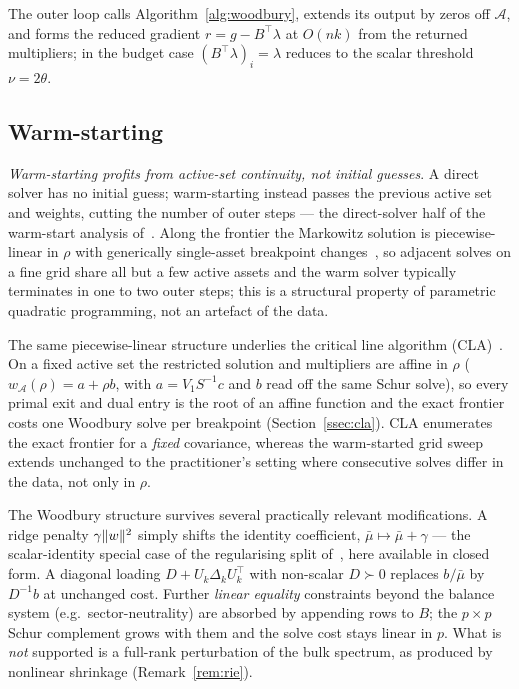 The outer loop calls Algorithm~\ref{alg:woodbury}, extends its output by zeros
off $\mathcal{A}$, and forms the reduced gradient $r = g - B^\top\lambda$ at
$O(nk)$ from the returned multipliers; in the budget case
$(B^\top\lambda)_i = \lambda$ reduces to the scalar threshold $\nu = 2\theta$.

\subsection{Warm-starting}

\emph{Warm-starting profits from active-set continuity, not initial guesses}.
A direct solver has no initial guess; warm-starting instead passes the previous
active set and weights, cutting the number of outer steps --- the direct-solver
half of the warm-start analysis
of~\cite[Proposition~4.2]{schmelzer2026nncg}. Along the frontier the
Markowitz solution is piecewise-linear in $\rho$ with generically single-asset
breakpoint changes~\cite{markowitz1956}, so adjacent solves on a fine grid share
all but a few active assets and the warm solver typically terminates in one to two
outer steps; this is a structural property of parametric quadratic programming, not
an artefact of the data.

\begin{remark}\label{rem:cla}
The same piecewise-linear structure underlies the critical line algorithm
(CLA)~\cite{markowitz1956,niedermayer2010,cvxcla}. On a fixed active set the
restricted solution and multipliers are affine in $\rho$
($w_\mathcal{A}(\rho) = a + \rho b$, with $a = V_1 S^{-1} c$ and $b$ read off the
same Schur solve), so every primal exit and dual entry is the root of an affine
function and the exact frontier costs one Woodbury solve per breakpoint
(Section~\ref{ssec:cla}). CLA enumerates the exact frontier for a \emph{fixed}
covariance, whereas the warm-started grid sweep extends unchanged to the
practitioner's setting where consecutive solves differ in the data, not only in
$\rho$.
\end{remark}

\begin{remark}\label{rem:ridge}
The Woodbury structure survives several practically relevant modifications.
A ridge penalty $\gamma\lVert w \rVert^2$ simply shifts the identity coefficient,
$\bar\mu \mapsto \bar\mu + \gamma$ --- the scalar-identity special case of the
regularising split of~\cite[Section~5]{schmelzer2026nncg}, here available in
closed form. A diagonal loading
$D + U_k\Delta_kU_k^\top$ with non-scalar $D \succ 0$ replaces $b/\bar\mu$
by $D^{-1}b$ at unchanged cost. Further \emph{linear equality} constraints
beyond the balance system (e.g.\ sector-neutrality) are absorbed by appending
rows to $B$; the $p \times p$ Schur complement grows with them and the solve
cost stays linear in $p$. What is
\emph{not} supported is a full-rank perturbation of the bulk spectrum, as
produced by nonlinear shrinkage (Remark~\ref{rem:rie}).
\end{remark}

